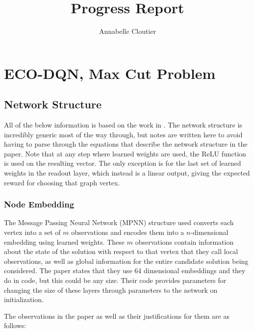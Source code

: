 \documentclass{article}
\title{Progress Report}
\author{Annabelle Cloutier}
\begin{document}
\maketitle

\tableofcontents

\section{ECO-DQN, Max Cut Problem}

\subsection{Network Structure}

All of the below information is based on the work in \cite{eco-dqn}.
The network structure is incredibly generic most of the way through, but notes are written here to avoid having to parse through the equations that describe the network structure in the paper. Note that at any step where learned weights are used, the ReLU function is used on the resulting vector. The only exception is for the last set of learned weights in the readout layer, which instead is a linear output, giving the expected reward for choosing that graph vertex. 

\subsubsection{Node Embedding}\label{node-embedding}

The Message Passing Neural Network (MPNN) structure used converts each vertex into a set of $m$ observations and encodes them into a $n$-dimensional embedding using learned weights. These $m$ observations contain information about the state of the solution with respect to that vertex that they call local observations, as well as global information for the entire candidate solution being considered. The paper states that they use 64 dimensional embeddings and they do in code, but this could be any size. Their code provides parameters for changing the size of these layers through parameters to the network on initialization.

The observations in the paper as well as their justifications for them are as follows: 
\end{document}
